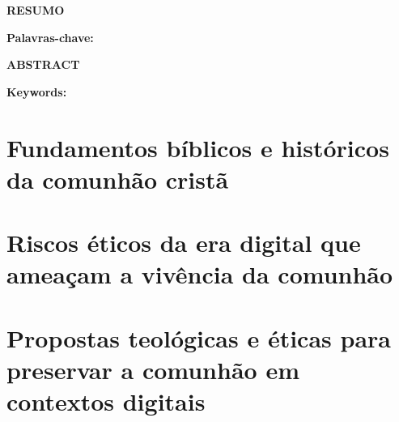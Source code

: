 \documentclass[12pt,a4paper]{article}
\begin{document}


\hypersetup{pageanchor=false}  %







\newpage
\pagestyle{plain}
\renewcommand{\baselinestretch}{1.5}
\normalsize

\newpage
\begin{center}
    \large \textbf{\MakeUppercase{Resumo}}
\end{center}

\vspace{1cm}

\justifying


\vspace{0.5cm}

\noindent
\textbf{Palavras-chave:} \textit{\palavrasChave}

\newpage
\begin{center}
    \large \textbf{\MakeUppercase{Abstract}}
\end{center}

\vspace{1cm}

\justifying


\vspace{0.5cm}

\noindent
\textbf{Keywords:} \textit{\keywords}

\newpage
\thispagestyle{empty}
\tableofcontents

\newpage
\pagestyle{plain}
\renewcommand{\baselinestretch}{1.5}
\normalsize
\section{Fundamentos bíblicos e históricos da comunhão cristã}

\newpage
\pagestyle{plain}
\renewcommand{\baselinestretch}{1.5}
\normalsize
\section{Riscos éticos da era digital que ameaçam a vivência da comunhão}

\newpage
\pagestyle{plain}
\renewcommand{\baselinestretch}{1.5}
\normalsize
\section{Propostas teológicas e éticas para preservar a comunhão em contextos digitais}

\newpage

\end{document}
